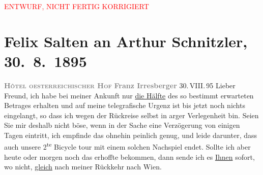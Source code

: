 
\begin{center}
            \textcolor{red}{ENTWURF, NICHT FERTIG KORRIGIERT}
                      \end{center}
            
         
         \renewcommand{\erwaehntePersonen}{Personen: Lou Andreas-Salomé, Richard Beer-Hofmann, Siegfried Bing, Emma Fr., Vincent van Gogh, Paul Goldmann, Franz Irresberger, Karl Kraus, Charlotte Pohl-Glas, Adele Sandrock}
         \renewcommand{\erwaehnteOrte}{Orte: Asien, Bad Ischl, Gmunden, Japan, München, Paris, Salzburg, Wien, Österreichischer Hof}
         \renewcommand{\erwaehnteWerke}{Werke: Ischler Brief. (Wiener Dichter auf der Esplanade), Wiener Familien-Journal}
               \section[Felix Salten an Arthur Schnitzler, 30. 8. 1895]{ Felix Salten an Arthur Schnitzler, 30. 8. 1895}\nopagebreak{}\rehead{ }\begin{ledgroupsized}[t]{13cm}\normalsize\beginnumbering \toendnotes[C]{\smallbreak\pagebreak[2]} 
\toendnotes[C]{\smallbreak}\pstart
           \noindent{}\centering{}{\pb}\textcolor{gray}{\textbf{\textsc{Hôtel
                           oesterreichischer Hof}}}\pend
           \pstart
           \noindent{}\centering{}\textcolor{gray}{\textbf{Franz
                     Irresberger}}\pend
           \pstart
           \raggedleft{}30. VIII. 95\pend
           \pstart
           Lieber Freund, ich habe bei meiner Ankunft nur \uline{die Hälfte} des so bestimmt erwarteten Betrages erhalten und auf meine
               telegrafische Urgenz ist bis jetzt noch nichts eingelangt, so dass ich wegen der
               Rückreise selbst in arger Verlegenheit bin. Seien Sie mir deshalb nicht böse, wenn in
               der Sache eine Verzögerung von einigen Tagen eintritt, ich empfinde das ohnehin
               peinlich genug, und leide darunter, dass auch unsere 2\textsuperscript{te}
               Bicycle tour mit einem solchen Nachspiel endet. Sollte ich aber heute oder
                  morgen noch das erhoffte bekommen, dann sende ich es \uline{Ihnen} sofort, wo nicht, \uline{gleich} nach meiner Rückkehr nach Wien.

\end{ledgroupsized}
